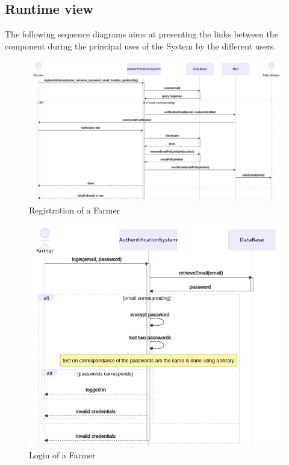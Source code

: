\subsection{Runtime view}
The following sequence diagrams aims at presenting the links between the component during the principal uses of the System by the different users.

\begin{figure} [!h]
	\centering
	\includegraphics[width=\textwidth]{Images/seq_registration.png}
	\caption{\label{fig:seq_registration} Registration of a Farmer}
\end{figure}

\begin{figure} [!h]
	\centering
	\includegraphics[width=\textwidth]{Images/seq_login.png}
	\caption{\label{fig:seq_login} Login of a Farmer}
\end{figure}

